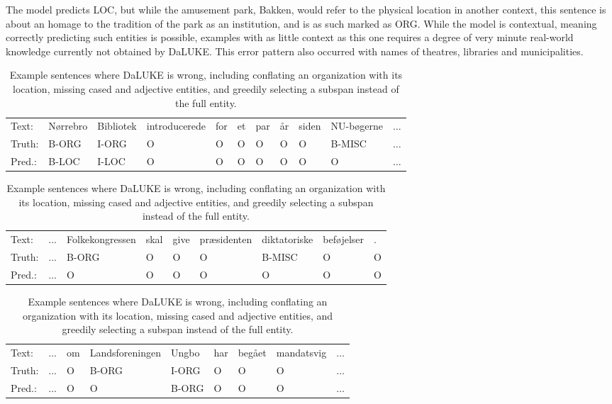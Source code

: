 \documentclass[main.tex]{subfiles}
\begin{document}
The model predicts LOC, but while the amusement park, Bakken, would refer to the physical location in another context, this sentence is about an homage to the tradition of the park as an institution, and is as such marked as ORG.
While the model is contextual, meaning correctly predicting such entities is possible, examples with as little context as this one requires a degree of very minute real-world knowledge currently not obtained by DaLUKE.
This error pattern also occurred with names of theatres, libraries and municipalities.
\begin{table}[H]
    \footnotesize
    \begin{tabular}{l|llllllllll}
        Text:   & Nørrebro  & Bibliotek  & introducerede  &for  &et  &par  &år  &siden  &NU-bøgerne & $\ldots$ \\
        Truth:  & B-ORG     & I-ORG      & O              &O    &O   &O    &O   &O      &B-MISC  & $\ldots$    \\
        Pred.:   & B-LOC     & I-LOC      & O              &O    &O   &O    &O   &O      &O   & $\ldots$\\\hline
    \end{tabular}\par
    \begin{tabular}{l|llllllll}
        Text:    & $\ldots$  &Folkekongressen  &skal  &give  &præsidenten  &diktatoriske  &beføjelser  &.\\
        Truth:   & $\ldots$  &B-ORG            &O     &O     &O            &B-MISC        &O           &O\\
        Pred.:   & $\ldots$  &O                &O     &O     &O            &O             &O           &O\\\hline
    \end{tabular}\par
    \begin{tabular}{l|llllllll}
        Text:    & $\ldots$ &  om  &Landsforeningen  &Ungbo  &har  &begået  &mandatsvig  & $\ldots$ \\
        Truth:   & $\ldots$ &  O   &B-ORG            &I-ORG  &O    &O       &O           & $\ldots$ \\
        Pred.:   & $\ldots$ &  O   &O                &B-ORG  &O    &O       &O           & $\ldots$
    \end{tabular}
    \caption{
        Example sentences where DaLUKE is wrong, including conflating an organization with its location, missing cased and adjective entities, and greedily selecting a subspan instead of the full entity.
    }
    \label{tab:dalukeerrors}
\end{table}\noindent
\end{document}

